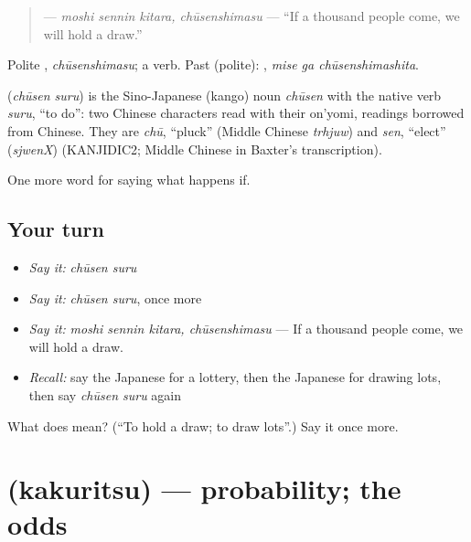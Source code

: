 \begin{quote}
\textbf{  } — \emph{moshi sennin kitara, chūsenshimasu} — \textquotedblleft{}If a thousand people come, we will hold a draw.\textquotedblright{}
\end{quote}

Polite \textbf{}, \emph{chūsenshimasu}; a  verb. Past (polite): \textbf{ }, \emph{mise ga chūsenshimashita}.

\begin{cousinweb}
\textbf{} (\emph{chūsen suru}) is the Sino-Japanese (kango) noun \emph{chūsen} with the native verb \emph{suru}, \textquotedblleft{}to do\textquotedblright{}: two Chinese characters read with their on'yomi, readings borrowed from Chinese. They are \emph{chū}, \textquotedblleft{}pluck\textquotedblright{} (Middle Chinese \emph{trhjuw}) and \emph{sen}, \textquotedblleft{}elect\textquotedblright{} (\emph{sjwenX}) (KANJIDIC2; Middle Chinese in Baxter's transcription).
\end{cousinweb}

\begin{grammarlens}[title={What you've built}]
One more word for saying what happens if.
\end{grammarlens}

\subsection*{Your turn}
\begin{itemize}
\raggedright
  \item \emph{Say it:} \emph{chūsen suru}
  \item \emph{Say it:} \emph{chūsen suru}, once more
  \item \emph{Say it:} \emph{moshi sennin kitara, chūsenshimasu} — If a thousand people come, we will hold a draw.
  \item \emph{Recall:} say the Japanese for a lottery, then the Japanese for drawing lots, then say \emph{chūsen suru} again
\end{itemize}

\begin{tcolorbox}[breakable,colback=teal!4,colframe=teal!35!black,title={Before you move on}]
What does  mean? (\textquotedblleft{}To hold a draw; to draw lots\textquotedblright{}.) Say it once more.
\end{tcolorbox}
\section[\texorpdfstring{\ja{かくりつ} (kakuritsu)}{かくりつ (kakuritsu)}]{ (kakuritsu) — probability; the odds}

